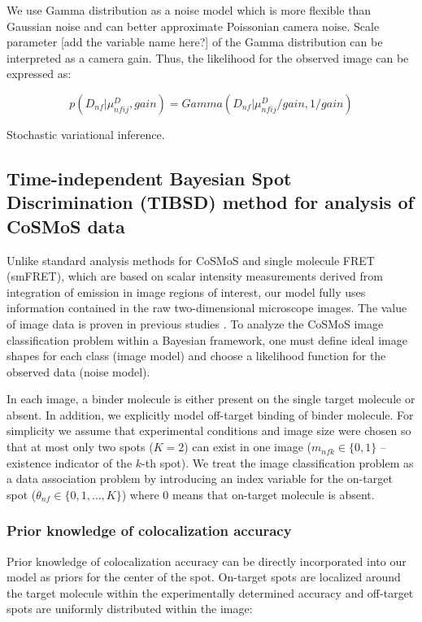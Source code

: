 We use Gamma distribution as a noise model which is more flexible than Gaussian noise and can better approximate Poissonian camera noise. Scale parameter [add the variable name here?] of the Gamma distribution can be interpreted as a camera gain. Thus, the likelihood for the observed image can be expressed as:
 
 \begin{equation*}
     p(D_{nf}|\mu^D_{nfij},gain) = Gamma(D_{nf}|\mu^D_{nfij}/gain,1/gain)
 \end{equation*}

Stochastic variational inference.

\subsection{Time-independent Bayesian Spot Discrimination (TIBSD) method for analysis of CoSMoS data}

Unlike standard analysis methods for CoSMoS and single molecule FRET (smFRET), which are based on scalar intensity measurements derived from integration of emission in image regions of interest, our model fully uses information contained in the raw two-dimensional microscope images. The value of image data is proven in previous studies \citep{Friedman2015-nx,Smith2019-yb}. To analyze the CoSMoS image classification problem within a Bayesian framework, one must define ideal image shapes for each class (image model) and choose a likelihood function for the observed data (noise model).

In each image, a binder molecule is either present on the single target molecule or absent. In addition, we explicitly model off-target binding of binder molecule. For simplicity  we assume that experimental conditions and image size were chosen so that at most only two spots ($K=2$) can exist in one image ($m_{nfk} \in \{ 0,1 \}$ -- existence indicator of the $k$-th spot). We treat the image classification problem as a data association problem by introducing an index variable for the on-target spot ($\theta_{nf} \in \{ 0,1,\dots,K \}$) where 0 means that on-target molecule is absent.





\subsubsection{Prior knowledge of colocalization accuracy}

Prior knowledge of colocalization accuracy can be directly incorporated into our model as priors for the center of the spot. On-target spots are localized around the target molecule within the experimentally determined accuracy and off-target spots are uniformly distributed within the image:

